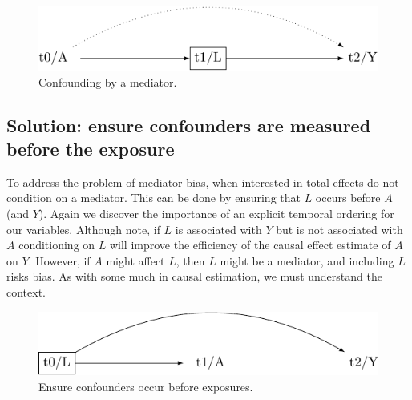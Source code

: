 \documentclass[
  singlecolumn]{report}
\begin{document}
\begin{figure}

{\centering \includegraphics[width=1\textwidth,height=\textheight]{causal-dags_files/figure-pdf/fig-dag-mediator-1.pdf}

}

\caption{\label{fig-dag-mediator}Confounding by a mediator.}

\end{figure}

\hypertarget{solution-ensure-confounders-are-measured-before-the-exposure}{%
\subsection{Solution: ensure confounders are measured before the
exposure}\label{solution-ensure-confounders-are-measured-before-the-exposure}}

To address the problem of mediator bias, when interested in total
effects do not condition on a mediator. This can be done by ensuring
that \(L\) occurs before \(A\) (and \(Y\)). Again we discover the
importance of an explicit temporal ordering for our variables. Although
note, if \(L\) is associated with \(Y\) but is not associated with \(A\)
conditioning on \(L\) will improve the efficiency of the causal effect
estimate of \(A\) on \(Y\). However, if \(A\) might affect \(L\), then
\(L\) might be a mediator, and including \(L\) risks bias. As with some
much in causal estimation, we must understand the context.

\begin{figure}

{\centering \includegraphics[width=1\textwidth,height=\textheight]{causal-dags_files/figure-pdf/fig-dag-mediator-solution-1.pdf}

}

\caption{\label{fig-dag-mediator-solution}Ensure confounders occur
before exposures.}

\end{figure}
\end{document}

